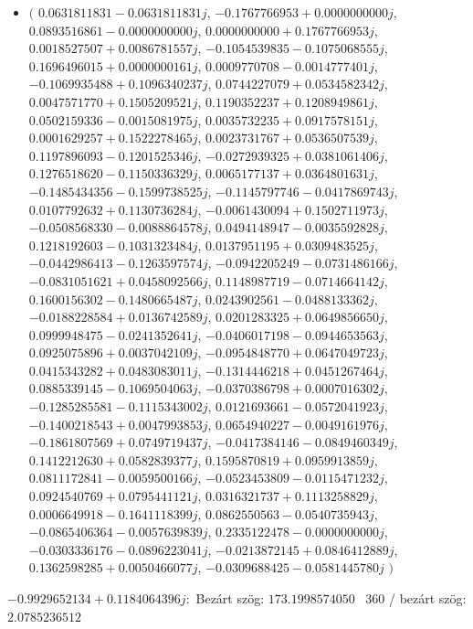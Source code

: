 \documentclass[14pt,a4paper]{article}
\begin{document}
\begin{itemize}
\item
$\big($
$0.0631811831-0.0631811831j$, $-0.1767766953+0.0000000000j$, $0.0893516861-0.0000000000j$, $0.0000000000+0.1767766953j$, $0.0018527507+0.0086781557j$, $-0.1054539835-0.1075068555j$, $0.1696496015+0.0000000161j$, $0.0009770708-0.0014777401j$, $-0.1069935488+0.1096340237j$, $0.0744227079+0.0534582342j$, $0.0047571770+0.1505209521j$, $0.1190352237+0.1208949861j$, $0.0502159336-0.0015081975j$, $0.0035732235+0.0917578151j$, $0.0001629257+0.1522278465j$, $0.0023731767+0.0536507539j$, $0.1197896093-0.1201525346j$, $-0.0272939325+0.0381061406j$, $0.1276518620-0.1150336329j$, $0.0065177137+0.0364801631j$, $-0.1485434356-0.1599738525j$, $-0.1145797746-0.0417869743j$, $0.0107792632+0.1130736284j$, $-0.0061430094+0.1502711973j$, $-0.0508568330-0.0088864578j$, $0.0494148947-0.0035592828j$, $0.1218192603-0.1031323484j$, $0.0137951195+0.0309483525j$, $-0.0442986413-0.1263597574j$, $-0.0942205249-0.0731486166j$, $-0.0831051621+0.0458092566j$, $0.1148987719-0.0714664142j$, $0.1600156302-0.1480665487j$, $0.0243902561-0.0488133362j$, $-0.0188228584+0.0136742589j$, $0.0201283325+0.0649856650j$, $0.0999948475-0.0241352641j$, $-0.0406017198-0.0944653563j$, $0.0925075896+0.0037042109j$, $-0.0954848770+0.0647049723j$, $0.0415343282+0.0483083011j$, $-0.1314446218+0.0451267464j$, $0.0885339145-0.1069504063j$, $-0.0370386798+0.0007016302j$, $-0.1285285581-0.1115343002j$, $0.0121693661-0.0572041923j$, $-0.1400218543+0.0047993853j$, $0.0654940227-0.0049161976j$, $-0.1861807569+0.0749719437j$, $-0.0417384146-0.0849460349j$, $0.1412212630+0.0582839377j$, $0.1595870819+0.0959913859j$, $0.0811172841-0.0059500166j$, $-0.0523453809-0.0115471232j$, $0.0924540769+0.0795441121j$, $0.0316321737+0.1113258829j$, $0.0006649918-0.1641118399j$, $0.0862550563-0.0540735943j$, $-0.0865406364-0.0057639839j$, $0.2335122478-0.0000000000j$, $-0.0303336176-0.0896223041j$, $-0.0213872145+0.0846412889j$, $0.1362598285+0.0050466077j$, $-0.0309688425-0.0581445780j$
$\big)$
\end{itemize}
$-0.9929652134+0.1184064396j$:\
Bezárt szög: $173.1998574050$ \
360 / bezárt szög: $2.0785236512$\
\end{document}
